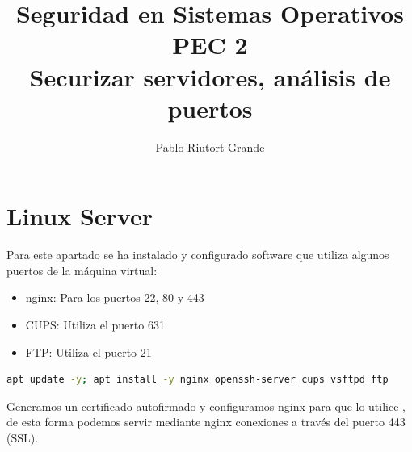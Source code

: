 \documentclass[10pt,a4paper]{article}
\author{Pablo Riutort Grande}
\title{Seguridad en Sistemas Operativos \\\vspace{0.3cm}PEC 2\\ \vspace{1cm}\textbf{Securizar servidores, análisis de puertos}}
\begin{document}
\maketitle

\section{Linux Server}
Para este apartado se ha instalado y configurado software que utiliza algunos puertos de la máquina virtual:
\begin{itemize}
\item nginx: Para los puertos 22, 80 y 443
\item CUPS: Utiliza el puerto 631
\item FTP: Utiliza el puerto 21
\end{itemize}

\begin{lstlisting}[language=bash]
apt update -y; apt install -y nginx openssh-server cups vsftpd ftp
\end{lstlisting}
Generamos un certificado autofirmado y configuramos nginx para que lo utilice \cite{nginx}, de esta forma podemos servir mediante nginx conexiones a través del puerto 443 (SSL).
\end{document}

